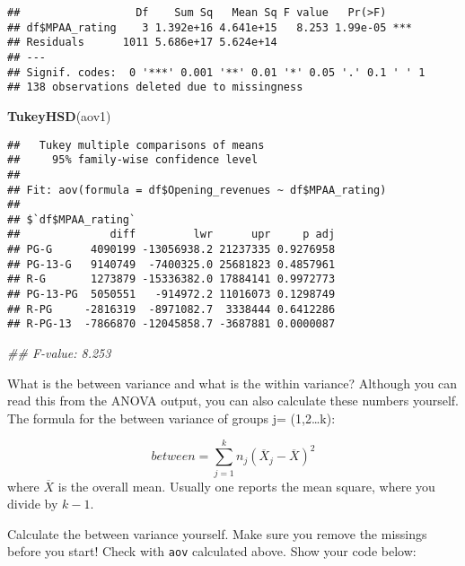 \documentclass[
]{article}
\newenvironment{Shaded}{\begin{snugshade}}{\end{snugshade}}
\newcommand{\CommentTok}[1]{\textcolor[rgb]{0.56,0.35,0.01}{\textit{#1}}}
\newcommand{\KeywordTok}[1]{\textcolor[rgb]{0.13,0.29,0.53}{\textbf{#1}}}
\newcommand{\NormalTok}[1]{#1}
\begin{document}
\begin{verbatim}
##                  Df    Sum Sq   Mean Sq F value   Pr(>F)    
## df$MPAA_rating    3 1.392e+16 4.641e+15   8.253 1.99e-05 ***
## Residuals      1011 5.686e+17 5.624e+14                     
## ---
## Signif. codes:  0 '***' 0.001 '**' 0.01 '*' 0.05 '.' 0.1 ' ' 1
## 138 observations deleted due to missingness
\end{verbatim}

\begin{Shaded}
\begin{Highlighting}[]
\KeywordTok{TukeyHSD}\NormalTok{(aov1)}
\end{Highlighting}
\end{Shaded}

\begin{verbatim}
##   Tukey multiple comparisons of means
##     95% family-wise confidence level
## 
## Fit: aov(formula = df$Opening_revenues ~ df$MPAA_rating)
## 
## $`df$MPAA_rating`
##              diff         lwr      upr     p adj
## PG-G      4090199 -13056938.2 21237335 0.9276958
## PG-13-G   9140749  -7400325.0 25681823 0.4857961
## R-G       1273879 -15336382.0 17884141 0.9972773
## PG-13-PG  5050551   -914972.2 11016073 0.1298749
## R-PG     -2816319  -8971082.7  3338444 0.6412286
## R-PG-13  -7866870 -12045858.7 -3687881 0.0000087
\end{verbatim}

\begin{Shaded}
\begin{Highlighting}[]
\CommentTok{## F-value: 8.253}
\end{Highlighting}
\end{Shaded}

What is the between variance and what is the within variance? Although
you can read this from the ANOVA output, you can also calculate these
numbers yourself. The formula for the between variance of groups j=
(1,2\ldots k):

\[between=\sum_{j=1}^kn_{j}\left(\overline{X}_{j}-\overline{X}\right)^2\]
where \(\overline{X}\) is the overall mean. Usually one reports the mean
square, where you divide by \(k-1\).

Calculate the between variance yourself. Make sure you remove the
missings before you start! Check with \texttt{aov} calculated above.
Show your code below:
\end{document}

